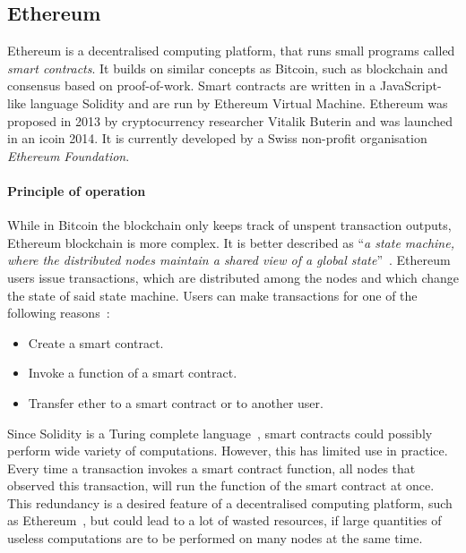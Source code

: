 \subsection{Ethereum}

Ethereum is a decentralised computing platform, that runs small programs called \textit{smart contracts}. It builds on similar concepts as Bitcoin, such as blockchain and consensus based on proof-of-work. Smart contracts are written in a JavaScript-like language Solidity and are run by Ethereum Virtual Machine. Ethereum was proposed in 2013 by cryptocurrency researcher Vitalik Buterin and was launched in an \acrlong{ico}\footnotemark  in 2014. 
% 
% 
It is currently developed by a Swiss non-profit organisation \textit{Ethereum Foundation}.\footnotemark
% 

\paragraph{Principle of operation}
While in Bitcoin the blockchain only keeps track of unspent transaction outputs, Ethereum blockchain is more complex. It is better described as ``\textit{a state machine, where the distributed nodes maintain a shared view of a global state}''~\cite{Tikhomirov2018Ethereum:Perspectives}. Ethereum users issue transactions, which are distributed among the nodes and which change the state of said state machine. Users can make transactions for one of the following reasons~\cite{Atzei2017ASoK}:
\begin{itemize}[noitemsep]
    \item Create a smart contract.
    \item Invoke a function of a smart contract.
    \item Transfer ether to a smart contract or to another user.
\end{itemize}

Since Solidity is a Turing complete language~\cite{Tikhomirov2018Ethereum:Perspectives, Atzei2017ASoK, Dannen2017IntroducingSolidity}, smart contracts could possibly perform wide variety of computations. However, this has limited use in practice. Every time a transaction invokes a smart contract function, all nodes that observed this transaction, will run the function of the smart contract at once. This redundancy is a desired feature of a decentralised computing platform, such as Ethereum~\cite{EthereumCommunityEthereumDocumentation}, but could lead to a lot of wasted resources, if large quantities of useless computations are to be performed on many nodes at the same time.

